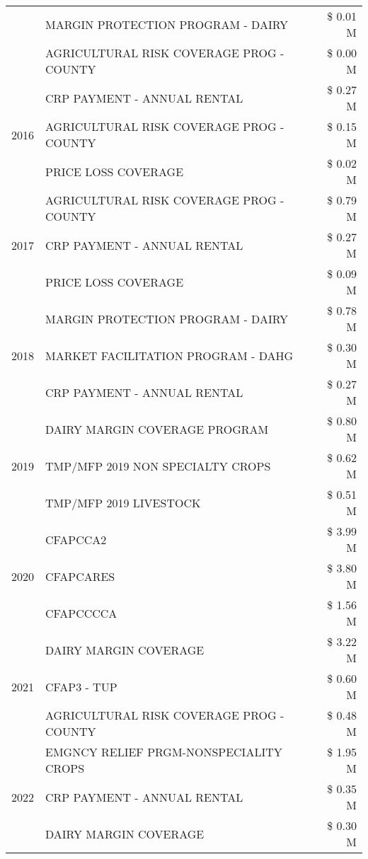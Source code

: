 \begin{tabular}{llr}
 & MARGIN PROTECTION PROGRAM - DAIRY & \$ 0.01 M \\
 & AGRICULTURAL RISK COVERAGE PROG - COUNTY & \$ 0.00 M \\
\cline{1-3}
\multirow[t]{3}{*}{2016} & CRP PAYMENT - ANNUAL RENTAL & \$ 0.27 M \\
 & AGRICULTURAL RISK COVERAGE PROG - COUNTY & \$ 0.15 M \\
 & PRICE LOSS COVERAGE & \$ 0.02 M \\
\cline{1-3}
\multirow[t]{3}{*}{2017} & AGRICULTURAL RISK COVERAGE PROG - COUNTY & \$ 0.79 M \\
 & CRP PAYMENT - ANNUAL RENTAL & \$ 0.27 M \\
 & PRICE LOSS COVERAGE & \$ 0.09 M \\
\cline{1-3}
\multirow[t]{3}{*}{2018} & MARGIN PROTECTION PROGRAM - DAIRY & \$ 0.78 M \\
 & MARKET FACILITATION PROGRAM - DAHG & \$ 0.30 M \\
 & CRP PAYMENT - ANNUAL RENTAL & \$ 0.27 M \\
\cline{1-3}
\multirow[t]{3}{*}{2019} & DAIRY MARGIN COVERAGE PROGRAM & \$ 0.80 M \\
 & TMP/MFP 2019 NON SPECIALTY CROPS & \$ 0.62 M \\
 & TMP/MFP 2019 LIVESTOCK & \$ 0.51 M \\
\cline{1-3}
\multirow[t]{3}{*}{2020} & CFAPCCA2 & \$ 3.99 M \\
 & CFAPCARES & \$ 3.80 M \\
 & CFAPCCCCA & \$ 1.56 M \\
\cline{1-3}
\multirow[t]{3}{*}{2021} & DAIRY MARGIN COVERAGE & \$ 3.22 M \\
 & CFAP3 - TUP & \$ 0.60 M \\
 & AGRICULTURAL RISK COVERAGE PROG - COUNTY & \$ 0.48 M \\
\cline{1-3}
\multirow[t]{3}{*}{2022} & EMGNCY RELIEF PRGM-NONSPECIALITY CROPS & \$ 1.95 M \\
 & CRP PAYMENT - ANNUAL RENTAL & \$ 0.35 M \\
 & DAIRY MARGIN COVERAGE & \$ 0.30 M \\
\cline{1-3}
\bottomrule
\end{tabular}
